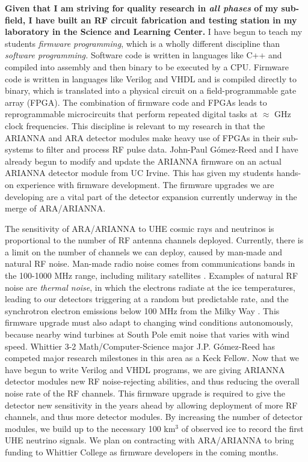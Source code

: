\documentclass[../../main.tex]{subfiles}
\begin{document}
\textbf{Given that I am striving for quality research in \textit{all phases} of my sub-field, I have built an RF circuit fabrication and testing station in my laboratory in the Science and Learning Center.}  I have begun to teach my students \textit{firmware programming}, which is a wholly different discipline than \textit{software programming.}  Software code is written in languages like C++ and compiled into assembly and then binary to be executed by a CPU.  Firmware code is written in languages like Verilog and VHDL and is compiled directly to binary, which is translated into a physical circuit on a field-programmable gate array (FPGA).  The combination of firmware code and FPGAs leads to reprogrammable microcircuits that perform repeated digital tasks at $\approx$ GHz clock frequencies.  This discipline is relevant to my research in that the ARIANNA and ARA detector modules make heavy use of FPGAs in their sub-systems to filter and process RF pulse data.  John-Paul G\'{o}mez-Reed and I have already begun to modify and update the ARIANNA firmware on an actual ARIANNA detector module from UC Irvine.  This has given my students hands-on experience with firmware development.  The firmware upgrades we are developing are a vital part of the detector expansion currently underway in the merge of ARA/ARIANNA. \\ \hspace{0.1cm}

The sensitivity of ARA/ARIANNA to UHE cosmic rays and neutrinos is proportional to the number of RF antenna channels deployed.  Currently, there is a limit on the number of channels we can deploy, caused by man-made and natural RF noise.  Man-made radio noise comes from communications bands in the 100-1000 MHz range, including military satellites \cite{ALLISON201847}.  Examples of natural RF noise are \textit{thermal noise}, in which the electrons radiate at the ice temperatures, leading to our detectors triggering at a random but predictable rate, and the synchrotron electron emissions below 100 MHz from the Milky Way \cite{barwick2016radio}.  This firmware upgrade must also adapt to changing wind conditions autonomously, because nearby wind turbines at South Pole emit noise that varies with wind speed. Whittier 3-2 Math/Computer-Science major J.P. G\'{o}mez-Reed has competed major research milestones in this area as a Keck Fellow.  Now that we have begun to write Verilog and VHDL programs, we are giving ARIANNA detector modules new RF noise-rejecting abilities, and thus reducing the overall noise rate of the RF channels.  This firmware upgrade is required to give the detector new sensitivity in the years ahead by allowing deployment of more RF channels, and thus more detector modules.  By increasing the number of detector modules, we build up to the necessary 100 km$^3$ of observed ice to record the first UHE neutrino signals. We plan on contracting with ARA/ARIANNA to bring funding to Whittier College as firmware developers in the coming months. \\ \hspace{0.1cm}
\end{document}
